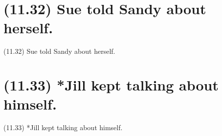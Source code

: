 \documentclass{article}
\begin{document}
\clearpage

%
%

\section*{(11.32) Sue told Sandy about herself.}

\bigbreak
\begin{enumerate*}
\item[(11.32)] Sue told Sandy about herself.
\end{enumerate*}
\bigbreak

\bigbreak
\begin{minipage}{\textwidth}
\end{minipage}
\bigbreak

\clearpage

%
%

\section*{(11.33) *Jill kept talking about himself.}

\bigbreak
\begin{enumerate*}
\item[(11.33)] *Jill kept talking about himself.
\end{enumerate*}
\bigbreak

\bigbreak
\begin{minipage}{\textwidth}
\end{minipage}
\bigbreak
\end{document}
